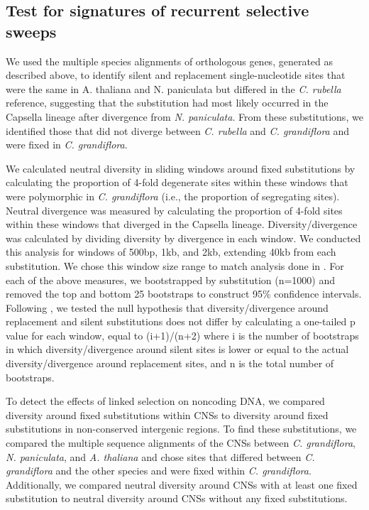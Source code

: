 \subsection{Test for signatures of recurrent selective sweeps}
We used the multiple species alignments of orthologous genes, generated as described above, to identify silent and replacement single-nucleotide sites that were the same in A. thaliana and N. paniculata but differed in the \textit{C. rubella} reference, suggesting that the substitution had most likely occurred in the Capsella lineage after divergence from \textit{N. paniculata}. From these substitutions, we identified those that did not diverge between \textit{C. rubella} and \textit{C. grandiflora} and were fixed in \textit{C. grandiflora}.

We calculated neutral diversity in sliding windows around fixed substitutions by calculating the proportion of 4-fold degenerate sites within these windows that were polymorphic in \textit{C. grandiflora} (i.e., the proportion of segregating sites). Neutral divergence was measured by calculating the proportion of 4-fold sites within these windows that diverged in the Capsella lineage. Diversity/divergence was calculated by dividing diversity by divergence in each window. We conducted this analysis for windows of 500bp, 1kb, and 2kb, extending 40kb from each substitution. We chose this window size range to match analysis done in \citet{Sattath2011-ns}. For each of the above measures, we bootstrapped by substitution (n=1000) and removed the top and bottom 25 bootstraps to construct 95\% confidence intervals. Following \citet{hernandez2011}, we tested the null hypothesis that diversity/divergence around replacement and silent substitutions does not differ by calculating a one-tailed p value for each window, equal to (i+1)/(n+2) where i is the number of bootstraps in which diversity/divergence around silent sites is lower or equal to the actual diversity/divergence around replacement sites, and n is the total number of bootstraps.

To detect the effects of linked selection on noncoding DNA, we compared diversity around fixed substitutions within CNSs to diversity around fixed substitutions in non-conserved intergenic regions. To find these substitutions, we compared the multiple sequence alignments of the CNSs between \textit{C. grandiflora}, \textit{N. paniculata}, and \textit{A. thaliana} and chose sites that differed between \textit{C. grandiflora} and the other species and were fixed within \textit{C. grandiflora}. Additionally, we compared neutral diversity around CNSs with at least one fixed substitution to neutral diversity around CNSs without any fixed substitutions. 

